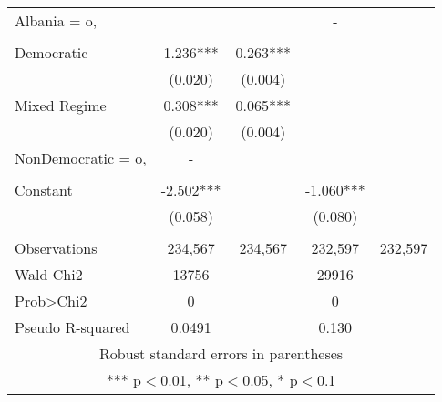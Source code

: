 \documentclass[]{article}
\begin{document}
\begin{tabular}{lcccc}
Albania = o, &  &  & - &  \\
 &  &  &  &  \\
Democratic & 1.236*** & 0.263*** &  &  \\
 & (0.020) & (0.004) &  &  \\
Mixed Regime & 0.308*** & 0.065*** &  &  \\
 & (0.020) & (0.004) &  &  \\
NonDemocratic = o, & - &  &  &  \\
 &  &  &  &  \\
Constant & -2.502*** &  & -1.060*** &  \\
 & (0.058) &  & (0.080) &  \\
 &  &  &  &  \\
Observations & 234,567 & 234,567 & 232,597 & 232,597 \\
Wald Chi2 & 13756 &  & 29916 &  \\
Prob>Chi2 & 0 &  & 0 &  \\
 Pseudo R-squared & 0.0491 &  & 0.130 &  \\ \hline
\multicolumn{5}{c}{ Robust standard errors in parentheses} \\
\multicolumn{5}{c}{ *** p$<$0.01, ** p$<$0.05, * p$<$0.1} \\
\end{tabular}
\end{document}

